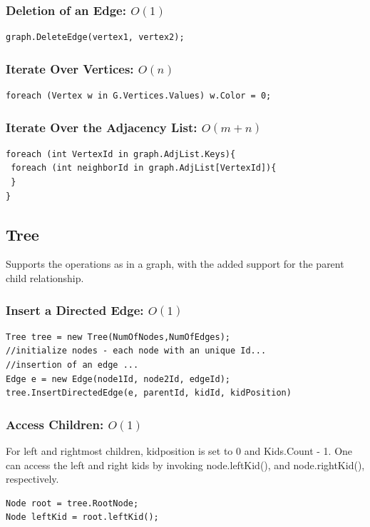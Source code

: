 \documentclass{article}
\begin{document}
\subsubsection{Deletion of an Edge: $O(1)$}
\begin{lstlisting}
graph.DeleteEdge(vertex1, vertex2);
\end{lstlisting}

\subsubsection{Iterate Over Vertices: $O(n)$}
\begin{lstlisting}
foreach (Vertex w in G.Vertices.Values) w.Color = 0;
\end{lstlisting}


\subsubsection{Iterate Over the Adjacency List: $O(m+n)$}
\begin{lstlisting}
foreach (int VertexId in graph.AdjList.Keys){
 foreach (int neighborId in graph.AdjList[VertexId]){
 }                
}
\end{lstlisting}


\subsection{Tree}
Supports the operations as in a graph, with the added support for the parent child relationship. 

\subsubsection{Insert a Directed Edge: $O(1)$} 
\begin{lstlisting}
Tree tree = new Tree(NumOfNodes,NumOfEdges);
//initialize nodes - each node with an unique Id...
//insertion of an edge ...
Edge e = new Edge(node1Id, node2Id, edgeId);
tree.InsertDirectedEdge(e, parentId, kidId, kidPosition)
\end{lstlisting}
\subsubsection{Access Children: $O(1)$}
For left and rightmost children, kidposition is set to 0 and  Kids.Count - 1. One can access the left and right kids by invoking node.leftKid(), and node.rightKid(), respectively.
\begin{lstlisting}
Node root = tree.RootNode;
Node leftKid = root.leftKid();
\end{lstlisting}
\end{document}
